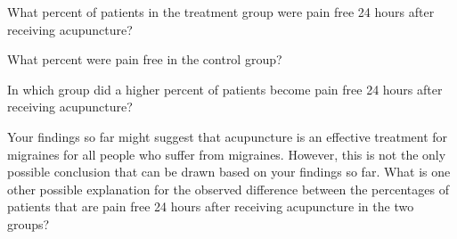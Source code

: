 {	\begin{parts}
		\item What percent of patients in the treatment group were pain free 24 hours 
		after receiving acupuncture? 
		\item What percent were pain free in the control group?
		\item In which group did a higher percent of patients become pain free 24 hours 
		after receiving acupuncture?
		\item Your findings so far might suggest that acupuncture is an effective treatment 
		for migraines for all people who suffer from migraines. However, this is not the 
		only possible conclusion that can be drawn based on your findings so far. What is 
		one other possible explanation for the observed difference between the percentages 
		of patients that are pain free 24 hours after receiving acupuncture in the two groups?
	\end{parts}
}{}


